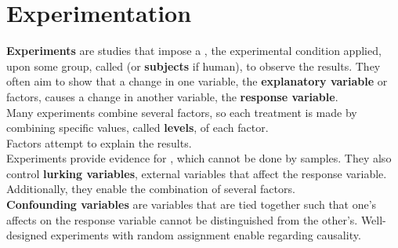 \documentclass[../AP_Statistics.tex]{subfiles}
\begin{document}
	\chapter{Experimentation}
		\textbf{Experiments} are studies that impose a , the experimental condition applied, upon some group, called  (or \textbf{subjects} if human), to observe the results. They often aim to show that a change in one variable, the \textbf{explanatory variable} or factors, causes a change in another variable, the \textbf{response variable}. \\
		Many experiments combine several factors, so each treatment is made by combining specific values, called \textbf{levels}, of each factor. \\
		Factors attempt to explain the results. \\
		Experiments provide evidence for , which cannot be done by samples. They also control \textbf{lurking variables}, external variables that affect the response variable. Additionally, they enable the combination of several factors. \\
		\textbf{Confounding variables} are variables that are tied together such that one's affects on the response variable cannot be distinguished from the other's.
		Well-designed experiments with random assignment enable  regarding causality.
\end{document}
